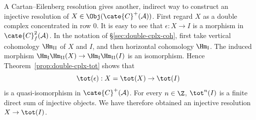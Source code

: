 \begin{remark}\label{rem:double-cplx-resolution}
	A Cartan--Eilenberg resolution gives another, indirect way to construct an
	injective resolution of $X\in\Obj(\cate{C}^+(\mathcal{A}))$. First regard
	$X$ as a double complex concentrated in row $0$. It is easy to see that
	$\epsilon:X\to I$ is a morphism in $\cate{C}^2_f(\mathcal{A})$. In the
	notation of \S\ref{sec:double-cplx-coh}, first take vertical cohomology
	$\Hm_{\mathrm{II}}$ of $X$ and $I$, and then horizontal cohomology
	$\Hm_{\mathrm{I}}$. The induced morphism
	$\Hm_{\mathrm{I}}\Hm_{\mathrm{II}}(X)\to
	\Hm_{\mathrm{I}}\Hm_{\mathrm{II}}(I)$ is an isomorphism. Hence
	Theorem~\ref{prop:double-cplx-tot} shows that
	\[ \tot(\epsilon): X = \tot(X) \to \tot(I) \]
	is a quasi-isomorphism in $\cate{C}^+(\mathcal{A})$. For every $n\in\Z$,
	$\tot^n(I)$ is a finite direct sum of injective objects. We have therefore
	obtained an injective resolution $X\to\tot(I)$.
\end{remark}

